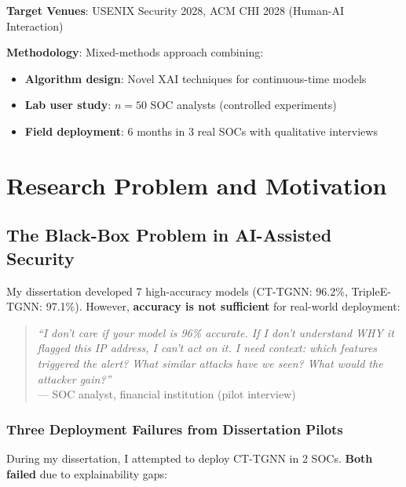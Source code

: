 \documentclass[11pt]{article}
\begin{document}
\textbf{Target Venues}: USENIX Security 2028, ACM CHI 2028 (Human-AI Interaction)

\textbf{Methodology}: Mixed-methods approach combining:
\begin{itemize}
    \item \textbf{Algorithm design}: Novel XAI techniques for continuous-time models
    \item \textbf{Lab user study}: $n = 50$ SOC analysts (controlled experiments)
    \item \textbf{Field deployment}: 6 months in 3 real SOCs with qualitative interviews
\end{itemize}

\section{Research Problem and Motivation}

\subsection{The Black-Box Problem in AI-Assisted Security}

My dissertation developed 7 high-accuracy models (CT-TGNN: 96.2\%, TripleE-TGNN: 97.1\%). However, \textbf{accuracy is not sufficient} for real-world deployment:

\begin{quote}
\textit{``I don't care if your model is 96\% accurate. If I don't understand WHY it flagged this IP address, I can't act on it. I need context: which features triggered the alert? What similar attacks have we seen? What would the attacker gain?''} \\
\hspace*{5em}— SOC analyst, financial institution (pilot interview)
\end{quote}

\subsubsection{Three Deployment Failures from Dissertation Pilots}

During my dissertation, I attempted to deploy CT-TGNN in 2 SOCs. \textbf{Both failed} due to explainability gaps:
\end{document}
